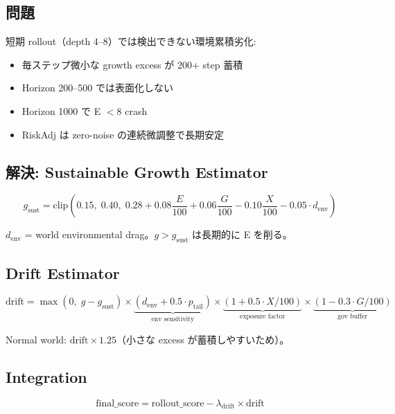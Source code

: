 \documentclass[11pt,a4paper]{article}
\begin{document}
\subsection{問題}

短期 rollout（depth 4--8）では検出できない環境累積劣化:
\begin{itemize}[leftmargin=1.5em]
  \item 毎ステップ微小な growth excess が 200+ step 蓄積
  \item Horizon 200--500 では表面化しない
  \item Horizon 1000 で E $< 8$ crash
  \item RiskAdj は zero-noise の連続微調整で長期安定
\end{itemize}

\subsection{解決: Sustainable Growth Estimator}

\begin{equation}
\boxed{g_\text{sust} = \text{clip}\left(0.15,\; 0.40,\; 0.28 + 0.08\frac{E}{100} + 0.06\frac{G}{100} - 0.10\frac{X}{100} - 0.05 \cdot d_\text{env}\right)}
\end{equation}

$d_\text{env}$ = world environmental drag。$g > g_\text{sust}$ は長期的に E を削る。

\subsection{Drift Estimator}

\begin{equation}
\boxed{\text{drift} = \max(0,\; g - g_\text{sust}) \times \underbrace{(d_\text{env} + 0.5 \cdot p_\text{tail})}_\text{env sensitivity} \times \underbrace{(1 + 0.5 \cdot X/100)}_\text{exposure factor} \times \underbrace{(1 - 0.3 \cdot G/100)}_\text{gov buffer}}
\end{equation}

Normal world: $\text{drift} \times 1.25$（小さな excess が蓄積しやすいため）。

\subsection{Integration}

\begin{equation}
\boxed{\text{final\_score} = \text{rollout\_score} - \lambda_\text{drift} \times \text{drift}}
\end{equation}
\end{document}
